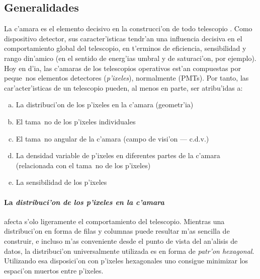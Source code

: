 \subsection{Generalidades}
%
La c'amara es el elemento decisivo en la construcci'on de todo
telescopio \Cherenkov. Como dispositivo detector, sus caracter'isticas
tendr'an una influencia decisiva en el comportamiento global del
telescopio, en t'erminos de eficiencia, sensibilidad y rango din'amico
(en el sentido de energ'ias umbral y de saturaci'on, por ejemplo). Hoy
en d'ia, las c'amaras de los telescopios \Cherenkov operativos est'an
compuestas por peque~nos elementos detectores (\emph{p'ixeles}),
normalmente \emph{} (PMTs). Por tanto, las
car'acter'isticas de un telescopio \Cherenkov pueden, al menos en
parte, ser atribu'idas a:
%
\begin{enumerate}[a.]
\item La distribuci'on de los p'ixeles en la c'amara (geometr'ia)
\item El tama~no de los p'ixeles individuales
\item El tama~no angular de la c'amara (campo de visi'on --- c.d.v.)
\item La densidad variable de p'ixeles en diferentes partes de la
c'amara (relacionada con el tama~no de los p'ixeles)
\item La sensibilidad de los p'ixeles
\end{enumerate}

\paragraph{La \emph{distribuci'on de los p'ixeles en la c'amara}} 
afecta s'olo ligeramente el comportamiento del telescopio. Mientras
una distribuci'on en forma de filas y columnas puede resultar m'as
sencilla de construir, e incluso m'as conveniente desde el punto de
vista del an'alisis de datos, la distribuci'on universalmente
utilizada es en forma de \emph{patr'on hexagonal}. Utilizando esa
disposici'on con p'ixeles hexagonales uno consigue minimizar los
espaci'on muertos entre p'ixeles.

